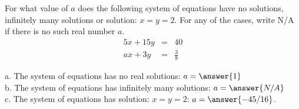 \documentclass{ximera}
\author{Parisa Fatheddin}
\begin{document}
\begin{exercise}  For what value of $a$ does the following system of equations have no solutions, infinitely many solutions or solution: $x=y=2$. For any of the cases, write N/A if there is no such real number $a$.
\begin{eqnarray*}
5x+15y &=& 40\\
ax +3y &=& \frac{3}{8}
\end{eqnarray*}
\begin{prompt}
a. The system of equations has no real solutions: $a= \answer{1}$\\
b. The system of equations has infinitely many solutions: $a= \answer{N/A}$\\
c. The system of equations has solution: $x=y=2$: $a=\answer{-45/16}$.
\end{prompt}
\end{exercise}
\end{document}
